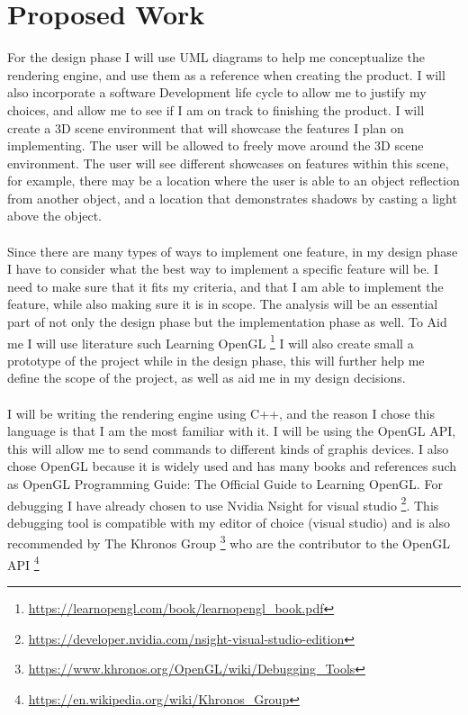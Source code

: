 \section{Proposed Work}
For the design phase I will use UML diagrams to help me conceptualize the rendering engine, and use them as a reference when creating the product. I will also incorporate a software Development life cycle to allow me to justify my choices, and allow me to see if I am on track to finishing the product.
I will create a 3D scene environment that will showcase the features I plan on implementing. The user will be allowed to freely move around the 3D scene environment. The user will see different showcases on features within this scene, for example, there may be a location where the user is able to an object reflection from another object, and a location that demonstrates shadows by casting a light above the object.
\\\\
Since there are many types of ways to implement one feature, in my design phase I have to consider what the best way to implement a specific feature will be. I need to make sure that it fits my criteria, and that I am able to implement the feature, while also making sure it is in scope. The analysis will be an essential part of not only the design phase but the implementation phase as well.
To Aid me I will use literature such Learning OpenGL \footnote{\url{https://learnopengl.com/book/learnopengl_book.pdf}}
I will also create small a prototype of the project while in the design phase, this will further help me define the scope of the project, as well as aid me in my design decisions.
\\\\
I will be writing the rendering engine using C++, and the reason I chose this language is that I am the most familiar with it. I will be using the OpenGL API, this will allow me to send commands to different kinds of graphis devices\citep{designengine}. I also chose OpenGL because it is widely used and has many books and references such as OpenGL Programming Guide: The Official Guide to Learning OpenGL\cite{opengl30}. 
For debugging I have already chosen to use Nvidia Nsight for visual studio \footnote{\url{https://developer.nvidia.com/nsight-visual-studio-edition}}. This debugging tool is compatible with my editor of choice (visual studio) and is also recommended by The Khronos Group \footnote{\url{https://www.khronos.org/OpenGL/wiki/Debugging_Tools}} who are the contributor to the OpenGL API \footnote{\url{https://en.wikipedia.org/wiki/Khronos_Group}}

